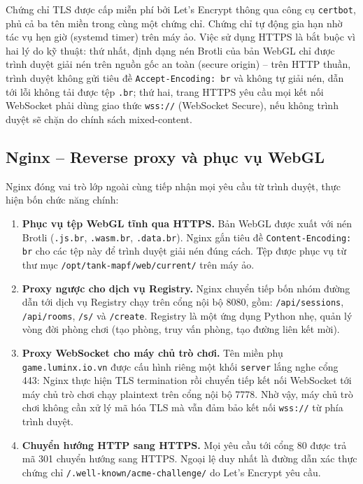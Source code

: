 \documentclass[../DoAn.tex]{subfiles}
\begin{document}
Chứng chỉ TLS được cấp miễn phí bởi Let's Encrypt thông qua công cụ \texttt{certbot}, phủ
cả ba tên miền trong cùng một chứng chỉ. Chứng chỉ tự động gia hạn nhờ tác vụ hẹn giờ
(systemd timer) trên máy ảo. Việc sử dụng HTTPS là bắt buộc vì hai lý do kỹ thuật: thứ nhất,
định dạng nén Brotli của bản WebGL chỉ được trình duyệt giải nén trên nguồn gốc an toàn
(secure origin) -- trên HTTP thuần, trình duyệt không gửi tiêu đề
\texttt{Accept-Encoding:\,br} và không tự giải nén, dẫn tới lỗi không tải được tệp
\texttt{.br}; thứ hai, trang HTTPS yêu cầu mọi kết nối WebSocket phải dùng giao thức
\texttt{wss://} (WebSocket Secure), nếu không trình duyệt sẽ chặn do chính sách
mixed-content.

\subsection{Nginx -- Reverse proxy và phục vụ WebGL}

Nginx đóng vai trò lớp ngoài cùng tiếp nhận mọi yêu cầu từ trình duyệt, thực hiện bốn
chức năng chính:

\begin{enumerate}
\item \textbf{Phục vụ tệp WebGL tĩnh qua HTTPS.} Bản WebGL được xuất với nén Brotli
      (\texttt{.js.br}, \texttt{.wasm.br}, \texttt{.data.br}). Nginx gắn tiêu đề
      \texttt{Content-Encoding:\,br} cho các tệp này để trình duyệt giải nén đúng cách.
      Tệp được phục vụ từ thư mục \texttt{/opt/tank-mapf/web/current/} trên máy ảo.

\item \textbf{Proxy ngược cho dịch vụ Registry.} Nginx chuyển tiếp bốn nhóm đường dẫn
      tới dịch vụ Registry chạy trên cổng nội bộ 8080, gồm:
      \texttt{/api/sessions}, \texttt{/api/rooms},
      \texttt{/s/} và \texttt{/create}.
      Registry là một ứng dụng Python nhẹ, quản lý vòng đời phòng chơi (tạo phòng, truy
      vấn phòng, tạo đường liên kết mời).

\item \textbf{Proxy WebSocket cho máy chủ trò chơi.} Tên miền phụ
      \texttt{game.luminx.io.vn} được cấu hình riêng một khối \texttt{server} lắng nghe
      cổng 443: Nginx thực hiện TLS termination rồi chuyển tiếp kết nối WebSocket tới máy
      chủ trò chơi chạy plaintext trên cổng nội bộ 7778. Nhờ vậy, máy chủ trò chơi không
      cần xử lý mã hóa TLS mà vẫn đảm bảo kết nối \texttt{wss://} từ phía trình duyệt.

\item \textbf{Chuyển hướng HTTP sang HTTPS.} Mọi yêu cầu tới cổng 80 được trả mã 301
      chuyển hướng sang HTTPS. Ngoại lệ duy nhất là đường dẫn xác thực chứng chỉ
      \texttt{/.well-known/\allowbreak acme-challenge/} do Let's Encrypt yêu cầu.
\end{enumerate}
\end{document}

